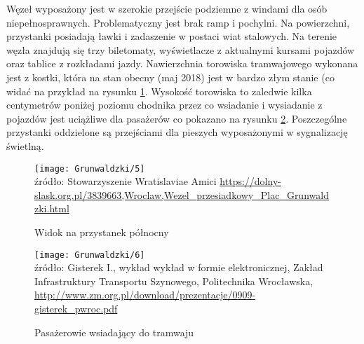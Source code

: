 \documentclass[twoside,12pt]{article}
\begin{document}
	Węzeł wyposażony jest w szerokie przejście podziemne z windami dla osób niepełnosprawnych. Problematyczny jest brak ramp i pochylni. Na powierzchni, przystanki posiadają ławki i zadaszenie w postaci wiat stalowych. Na terenie węzła znajdują się trzy biletomaty, wyświetlacze z aktualnymi kursami pojazdów oraz tablice z rozkładami jazdy. Nawierzchnia torowiska tramwajowego wykonana jest z kostki, która na stan obecny (maj 2018) jest w bardzo złym stanie (co widać na przykład na rysunku \ref{grunwaldzki5}. Wysokość torowiska to zaledwie kilka centymetrów poniżej poziomu chodnika przez co wsiadanie i wysiadanie z pojazdów jest uciążliwe dla pasażerów co pokazano na rysunku \ref{grunwaldzki6}. Poszczególne przystanki oddzielone są przejściami dla pieszych wyposażonymi w sygnalizację świetlną. 
	
	\begin{figure}[H]
		\centering
		\caption{Widok na przystanek północny}
		\texttt{[image: Grunwaldzki/5]}\\
		\footnotesize{źródło: Stowarzyszenie Wratislaviae Amici \url{https://dolny-slask.org.pl/3839663,Wroclaw,Wezel_przesiadkowy_Plac_Grunwaldzki.html}}
		\label{grunwaldzki5}
	\end{figure}	
	
		\begin{figure}[H]
		\centering
		\caption{Pasażerowie wsiadający do tramwaju}
		\texttt{[image: Grunwaldzki/6]}\\
		\footnotesize{źródło: Gisterek I., wykład wykład w formie elektronicznej, Zakład Infrastruktury Transportu Szynowego, Politechnika Wrocławska, \url{http://www.zm.org.pl/download/prezentacje/0909-gisterek_pwroc.pdf} \cite{grunwaldzki2}}
		\label{grunwaldzki6}
	\end{figure}	
	
\end{document}
